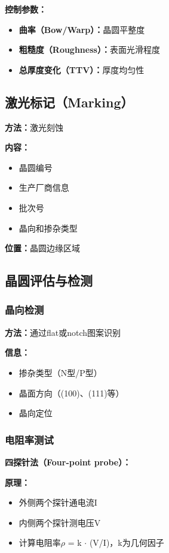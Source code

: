 \documentclass[UTF8,12pt,a4paper]{ctexart}
\begin{document}
\textbf{控制参数：}
\begin{itemize}
    \item \textbf{曲率（Bow/Warp）：}晶圆平整度
    \item \textbf{粗糙度（Roughness）：}表面光滑程度
    \item \textbf{总厚度变化（TTV）：}厚度均匀性
\end{itemize}

\subsection{激光标记（Marking）}

\textbf{方法：}激光刻蚀

\textbf{内容：}
\begin{itemize}
    \item 晶圆编号
    \item 生产厂商信息
    \item 批次号
    \item 晶向和掺杂类型
\end{itemize}

\textbf{位置：}晶圆边缘区域

\subsection{晶圆评估与检测}

\subsubsection{晶向检测}

\textbf{方法：}通过flat或notch图案识别

\textbf{信息：}
\begin{itemize}
    \item 掺杂类型（N型/P型）
    \item 晶面方向（(100)、(111)等）
    \item 晶向定位
\end{itemize}

\subsubsection{电阻率测试}

\textbf{四探针法（Four-point probe）：}

\textbf{原理：}
\begin{itemize}
    \item 外侧两个探针通电流I
    \item 内侧两个探针测电压V
    \item 计算电阻率$\rho$ = k $\cdot$ (V/I)，k为几何因子
\end{itemize}
\end{document}
